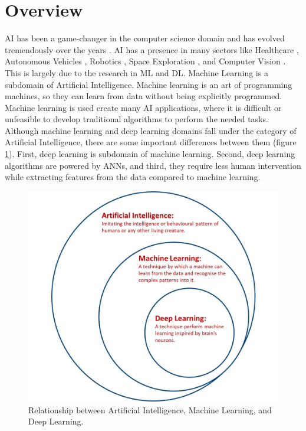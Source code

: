 \justifying
\setlength{\parskip}{1em}


\section{Overview}

\ac{AI} has been a game-changer in the computer science domain and has evolved tremendously over the years \cite{goodfellow2017deep}. \ac{AI} has a presence in many sectors like Healthcare \cite{Yu.2018}, Autonomous Vehicles \cite{Yurtsever_2020}, Robotics \cite{10.1007/978-3-642-82153-0_2}, Space Exploration \cite{Girimonte2007}, and Computer Vision \cite{2020}. This is largely due to the research in \ac{ML} and \ac{DL}. Machine Learning is a subdomain of Artificial Intelligence. Machine learning is an art of programming machines, so they can learn from data without being explicitly programmed. Machine learning is used create many \ac{AI} applications, where it is difficult or unfeasible to develop traditional algorithms to perform the needed tasks. Although machine learning and deep learning domains fall under the category of Artificial Intelligence, there are some important differences between them (figure \ref{fig:deepLearningSubset}). First, deep learning is subdomain of machine learning. Second, deep learning algorithms are powered by \acp{ANN}, and third, they require less human intervention while extracting features from the data compared to machine learning.


\begin{figure}[H]
        \begin{center}
 	    \includegraphics[scale=0.25]{images/Introduction/deeplearningsubset.jpg}
	    \caption[Relationship between Artificial Intelligence, Machine Learning, and Deep Learning.]{Relationship between Artificial Intelligence, Machine Learning, and Deep Learning.}
	    \label{fig:deepLearningSubset}
	    \end{center}
\end{figure}


